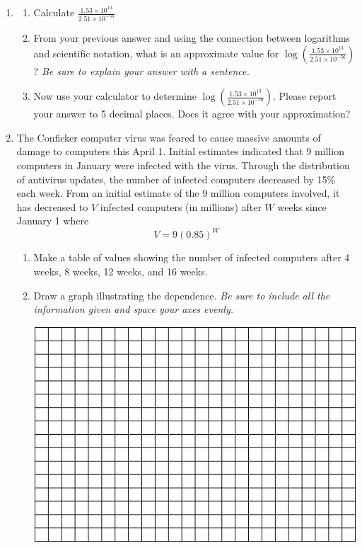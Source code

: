 \documentclass[12pt]{article}
\begin{document}
\newpage
\begin{enumerate}

\item \begin{enumerate}
\item Calculate $\displaystyle \frac{1.53 \times 10^{13}}{2.51 \times 10^{-56}} $
\vfill
\item From your previous answer and using the connection between logarithms and scientific notation, what is an approximate value for $\displaystyle \log \left( \frac{1.53 \times 10^{13}}{2.51 \times 10^{-56}} \right)$?  \emph{Be sure to explain your answer with a sentence.}
\vfill
\item Now use your calculator to determine  $\displaystyle \log \left(\frac{1.53 \times 10^{13}}{2.51 \times 10^{-56}}  \right)$. Please report your answer to 5 decimal places.  Does it agree with your approximation?
\vfill
\end{enumerate}
\newpage

\item The Conficker computer virus was feared to cause massive amounts of damage to computers this April 1.  Initial estimates indicated that 9 million computers in January were infected with the virus.  Through the distribution of antivirus updates, the number of infected computers decreased by 15\% each week.  From an initial estimate of the 9 million computers involved, it has decreased to $V$ infected computers (in millions) after $W$ weeks since January 1 where $$V = 9(0.85)^W$$

\begin{enumerate}
\item Make a table of values showing the number of infected computers after 4 weeks, 8 weeks, 12 weeks, and 16 weeks.
\vfill
\item Draw a graph illustrating the dependence.  \emph{Be sure to include all the information given and space your axes evenly.}

\vspace{.1in}
\begin{center}
 {\includegraphics [width = 6in] {../GraphPaper}}
\end{center}
\vspace{.1in}


\end{enumerate}
\end{enumerate}
\end{document}

